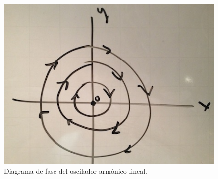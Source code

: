 \documentclass[11pt]{book}
\theoremstyle{definition}
\numberwithin{definition}{section}
\theoremstyle{theorem}
\numberwithin{theorem}{section}
\numberwithin{lemma}{section}
\numberwithin{corollary}{section}
\theoremstyle{plain}
\numberwithin{example}{section}
\begin{document}
\begin{figure}[h] \centering
    \includegraphics[scale=0.5]{figures/osciladorarmonico-diagramafase.jpg}
    \caption{Diagrama de fase del oscilador armónico lineal.}
\end{figure}
\end{document}
